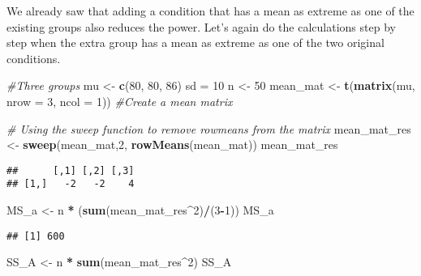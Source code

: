 \documentclass[]{article}
\newenvironment{Shaded}{\begin{snugshade}}{\end{snugshade}}
\newcommand{\KeywordTok}[1]{\textcolor[rgb]{0.13,0.29,0.53}{\textbf{#1}}}
\newcommand{\DataTypeTok}[1]{\textcolor[rgb]{0.13,0.29,0.53}{#1}}
\newcommand{\DecValTok}[1]{\textcolor[rgb]{0.00,0.00,0.81}{#1}}
\newcommand{\StringTok}[1]{\textcolor[rgb]{0.31,0.60,0.02}{#1}}
\newcommand{\CommentTok}[1]{\textcolor[rgb]{0.56,0.35,0.01}{\textit{#1}}}
\newcommand{\OperatorTok}[1]{\textcolor[rgb]{0.81,0.36,0.00}{\textbf{#1}}}
\newcommand{\NormalTok}[1]{#1}
\begin{document}
We already saw that adding a condition that has a mean as extreme as one
of the existing groups also reduces the power. Let's again do the
calculations step by step when the extra group has a mean as extreme as
one of the two original conditions.

\begin{Shaded}
\begin{Highlighting}[]
\CommentTok{#Three groups}
\NormalTok{mu <-}\StringTok{ }\KeywordTok{c}\NormalTok{(}\DecValTok{80}\NormalTok{, }\DecValTok{80}\NormalTok{, }\DecValTok{86}\NormalTok{)}
\NormalTok{sd =}\StringTok{ }\DecValTok{10}
\NormalTok{n <-}\StringTok{ }\DecValTok{50}
\NormalTok{mean_mat <-}\StringTok{ }\KeywordTok{t}\NormalTok{(}\KeywordTok{matrix}\NormalTok{(mu, }
                     \DataTypeTok{nrow =} \DecValTok{3}\NormalTok{,}
                     \DataTypeTok{ncol =} \DecValTok{1}\NormalTok{)) }\CommentTok{#Create a mean matrix}

\CommentTok{# Using the sweep function to remove rowmeans from the matrix}
\NormalTok{mean_mat_res <-}\StringTok{ }\KeywordTok{sweep}\NormalTok{(mean_mat,}\DecValTok{2}\NormalTok{, }\KeywordTok{rowMeans}\NormalTok{(mean_mat))   }
\NormalTok{mean_mat_res}
\end{Highlighting}
\end{Shaded}

\begin{verbatim}
##      [,1] [,2] [,3]
## [1,]   -2   -2    4
\end{verbatim}

\begin{Shaded}
\begin{Highlighting}[]
\NormalTok{MS_a <-}\StringTok{ }\NormalTok{n }\OperatorTok{*}\StringTok{ }\NormalTok{(}\KeywordTok{sum}\NormalTok{(mean_mat_res}\OperatorTok{^}\DecValTok{2}\NormalTok{)}\OperatorTok{/}\NormalTok{(}\DecValTok{3}\OperatorTok{-}\DecValTok{1}\NormalTok{))}
\NormalTok{MS_a}
\end{Highlighting}
\end{Shaded}

\begin{verbatim}
## [1] 600
\end{verbatim}

\begin{Shaded}
\begin{Highlighting}[]
\NormalTok{SS_A <-}\StringTok{ }\NormalTok{n }\OperatorTok{*}\StringTok{ }\KeywordTok{sum}\NormalTok{(mean_mat_res}\OperatorTok{^}\DecValTok{2}\NormalTok{)}
\NormalTok{SS_A}
\end{Highlighting}
\end{Shaded}
\end{document}
